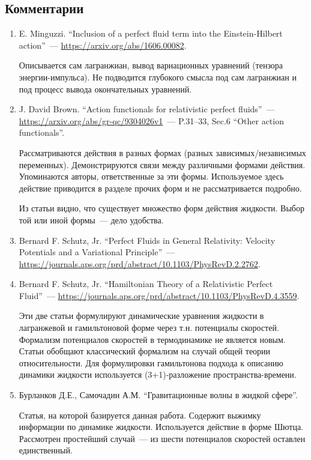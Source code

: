 \documentclass[\docroot/reports/draft/report.tex]{subfiles}
\begin{document}
\subsection{Комментарии}

    \begin{enumerate}
        \item E. Minguzzi. \enquote{Inclusion of a perfect fluid term into the Einstein-Hilbert action}~--- \url{https://arxiv.org/abs/1606.00082}.

        Описывается сам лагранжиан, вывод вариационных уравнений (тензора энергии-импульса). Не подводится глубокого смысла под сам лагранжиан и под процесс вывода окончательных уравнений.

        \item J. David Brown. \enquote{Action functionals for relativistic perfect fluids}~--- \url{https://arxiv.org/abs/gr-qc/9304026v1}~--- P.31--33, Sec.6 \enquote{Other action functionals}.

        Рассматриваются действия в разных формах (разных зависимых/независимых переменных). Демонстрируются связи между различными формами действия. Упоминаются авторы, ответственные за эти формы. Используемое здесь действие приводится в разделе прочих форм и не рассматривается подробно.

        Из статьи видно, что существует множество форм действия жидкости. Выбор той или иной формы~--- дело удобства.

        \item Bernard F. Schutz, Jr. \enquote{Perfect Fluids in General Relativity: Velocity Potentials and a Variational Principle}~--- \url{https://journals.aps.org/prd/abstract/10.1103/PhysRevD.2.2762}.

        \item Bernard F. Schutz, Jr. \enquote{Hamiltonian Theory of a Relativistic Perfect Fluid}~--- \url{https://journals.aps.org/prd/abstract/10.1103/PhysRevD.4.3559}.

        Эти две статьи формулируют динамические уравнения жидкости в лагранжевой и гамильтоновой форме через т.н. потенциалы скоростей. Формализм потенциалов скоростей в термодинамике не является новым. Статьи обобщают классический формализм на случай общей теории относительности. Для формулировки гамильтонова подхода к описанию динамики жидкости используется (3+1)-разложение пространства-времени.

        \item Бурланков Д.Е., Самочадин А.М. \enquote{Гравитационные волны в жидкой сфере}.

        Статья, на которой базируется данная работа. Содержит выжимку информации по динамике жидкости. Используется действие в форме Шютца. Рассмотрен простейший случай~--- из шести потенциалов скоростей оставлен единственный.
    \end{enumerate}

\end{document}
